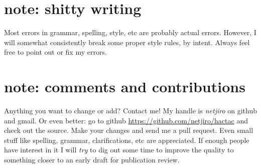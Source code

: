 \section*{note: shitty writing}
Most errors in grammar, spelling, style, etc are probably actual errors. However, I will somewhat consistently break some proper style rules, by intent. Always feel free to point out or fix my errors.


\section*{note: comments and contributions}
Anything you want to change or add? Contact me! My handle is \emph{netjiro} on github and gmail. Or even better: go to github \url{https://github.com/netjiro/hactac} and check out the source. Make your changes and send me a pull request. Even small stuff like spelling, grammar, clarifications, etc are appreciated. If enough people have interest in it I will \emph{try} to dig out some time to improve the quality to something closer to an early draft for publication review.


%







\cleardoublepage                %
\thispagestyle{empty}

\tableofcontents                %





